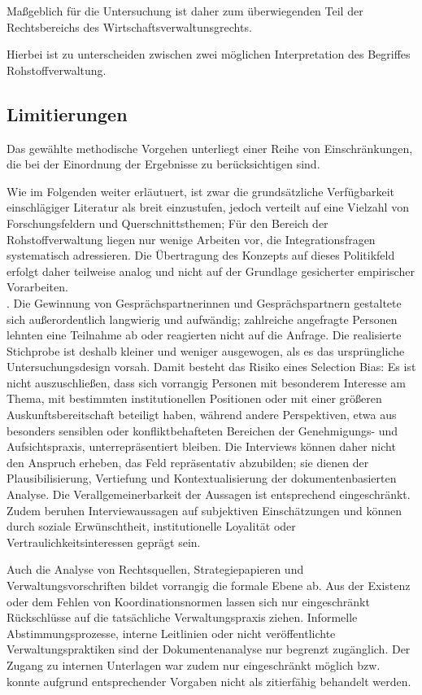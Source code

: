 \documentclass[12pt,a4paper,oneside]{book} %
\begin{document}
Maßgeblich für die Untersuchung ist daher zum überwiegenden Teil der Rechtsbereichs des Wirtschaftsverwaltunsgrechts.

Hierbei ist zu unterscheiden zwischen zwei möglichen Interpretation des Begriffes Rohstoffverwaltung.



\subsection{Limitierungen}

Das gewählte methodische Vorgehen unterliegt einer Reihe von Einschränkungen, die bei der Einordnung der Ergebnisse zu berücksichtigen sind.

Wie im Folgenden weiter erläutuert, ist zwar die grundsätzliche Verfügbarkeit einschlägiger Literatur als breit einzustufen, jedoch verteilt auf eine Vielzahl von Forschungsfeldern und Querschnittsthemen; Für den Bereich der Rohstoffverwaltung liegen nur wenige Arbeiten vor, die Integrationsfragen systematisch adressieren. Die Übertragung des Konzepts auf dieses Politikfeld erfolgt daher teilweise analog und nicht auf der Grundlage gesicherter empirischer Vorarbeiten.
\\
. Die Gewinnung von Gesprächspartnerinnen und Gesprächspartnern gestaltete sich außerordentlich langwierig und aufwändig; zahlreiche angefragte Personen lehnten eine Teilnahme ab oder reagierten nicht auf die Anfrage. Die realisierte Stichprobe ist deshalb kleiner und weniger ausgewogen, als es das ursprüngliche Untersuchungsdesign vorsah. Damit besteht das Risiko eines Selection Bias: Es ist nicht auszuschließen, dass sich vorrangig Personen mit besonderem Interesse am Thema, mit bestimmten institutionellen Positionen oder mit einer größeren Auskunftsbereitschaft beteiligt haben, während andere Perspektiven, etwa aus besonders sensiblen oder konfliktbehafteten Bereichen der Genehmigungs- und Aufsichtspraxis, unterrepräsentiert bleiben. Die Interviews können daher nicht den Anspruch erheben, das Feld repräsentativ abzubilden; sie dienen der Plausibilisierung, Vertiefung und Kontextualisierung der dokumentenbasierten Analyse. Die Verallgemeinerbarkeit der Aussagen ist entsprechend eingeschränkt. Zudem beruhen Interviewaussagen auf subjektiven Einschätzungen und können durch soziale Erwünschtheit, institutionelle Loyalität oder Vertraulichkeitsinteressen geprägt sein.

Auch die Analyse von Rechtsquellen, Strategiepapieren und Verwaltungsvorschriften bildet vorrangig die formale Ebene ab. Aus der Existenz oder dem Fehlen von Koordinationsnormen lassen sich nur eingeschränkt Rückschlüsse auf die tatsächliche Verwaltungspraxis ziehen. Informelle Abstimmungsprozesse, interne Leitlinien oder nicht veröffentlichte Verwaltungspraktiken sind der Dokumentenanalyse nur begrenzt zugänglich. Der Zugang zu internen Unterlagen war zudem nur eingeschränkt möglich bzw. konnte aufgrund entsprechender Vorgaben nicht als zitierfähig behandelt werden.
\end{document}
